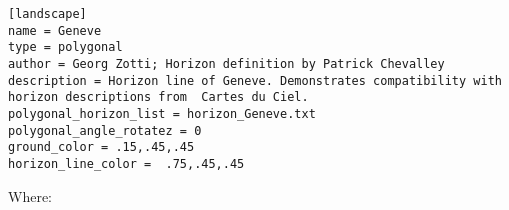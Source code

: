 \begin{config}
\texttt{{[}landscape{]}}\\
\texttt{name~=~Geneve}\\
\texttt{type~=~polygonal}\\
\texttt{author~=~Georg~Zotti;~Horizon~definition~by~Patrick~Chevalley}\\
\texttt{description~=~Horizon~line~of~Geneve.~Demonstrates~compatibility~with~horizon~descriptions~from~~Cartes~du~Ciel.}\\
\texttt{polygonal\_horizon\_list~=~horizon\_Geneve.txt}\\
\texttt{polygonal\_angle\_rotatez~=~0}\\
\texttt{ground\_color~=~.15,.45,.45}\\
\texttt{horizon\_line\_color~=~~.75,.45,.45}
\end{config}

Where:

